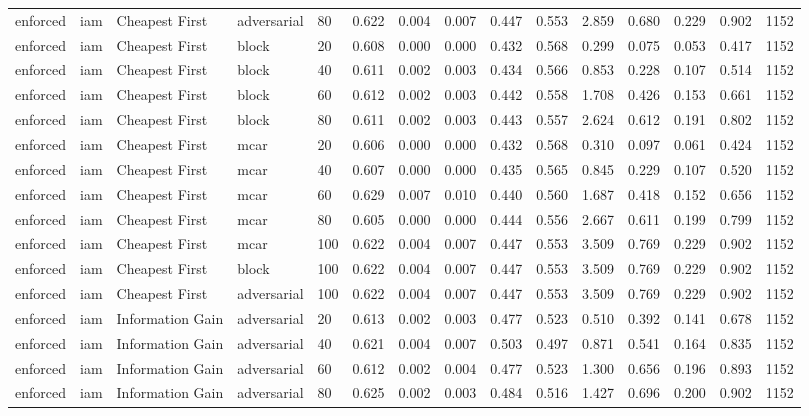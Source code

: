 \begin{table}[!ht]
{\begin{tabular}{lllllllllllllll}
enforced & iam & Cheapest First & adversarial & 80 & 0.622 & 0.004 & 0.007 & 0.447 & 0.553 & 2.859 & 0.680 & 0.229 & 0.902 & 1152 \\
enforced & iam & Cheapest First & block & 20 & 0.608 & 0.000 & 0.000 & 0.432 & 0.568 & 0.299 & 0.075 & 0.053 & 0.417 & 1152 \\
enforced & iam & Cheapest First & block & 40 & 0.611 & 0.002 & 0.003 & 0.434 & 0.566 & 0.853 & 0.228 & 0.107 & 0.514 & 1152 \\
enforced & iam & Cheapest First & block & 60 & 0.612 & 0.002 & 0.003 & 0.442 & 0.558 & 1.708 & 0.426 & 0.153 & 0.661 & 1152 \\
enforced & iam & Cheapest First & block & 80 & 0.611 & 0.002 & 0.003 & 0.443 & 0.557 & 2.624 & 0.612 & 0.191 & 0.802 & 1152 \\
enforced & iam & Cheapest First & mcar & 20 & 0.606 & 0.000 & 0.000 & 0.432 & 0.568 & 0.310 & 0.097 & 0.061 & 0.424 & 1152 \\
enforced & iam & Cheapest First & mcar & 40 & 0.607 & 0.000 & 0.000 & 0.435 & 0.565 & 0.845 & 0.229 & 0.107 & 0.520 & 1152 \\
enforced & iam & Cheapest First & mcar & 60 & 0.629 & 0.007 & 0.010 & 0.440 & 0.560 & 1.687 & 0.418 & 0.152 & 0.656 & 1152 \\
enforced & iam & Cheapest First & mcar & 80 & 0.605 & 0.000 & 0.000 & 0.444 & 0.556 & 2.667 & 0.611 & 0.199 & 0.799 & 1152 \\
enforced & iam & Cheapest First & mcar & 100 & 0.622 & 0.004 & 0.007 & 0.447 & 0.553 & 3.509 & 0.769 & 0.229 & 0.902 & 1152 \\
enforced & iam & Cheapest First & block & 100 & 0.622 & 0.004 & 0.007 & 0.447 & 0.553 & 3.509 & 0.769 & 0.229 & 0.902 & 1152 \\
enforced & iam & Cheapest First & adversarial & 100 & 0.622 & 0.004 & 0.007 & 0.447 & 0.553 & 3.509 & 0.769 & 0.229 & 0.902 & 1152 \\
enforced & iam & Information Gain & adversarial & 20 & 0.613 & 0.002 & 0.003 & 0.477 & 0.523 & 0.510 & 0.392 & 0.141 & 0.678 & 1152 \\
enforced & iam & Information Gain & adversarial & 40 & 0.621 & 0.004 & 0.007 & 0.503 & 0.497 & 0.871 & 0.541 & 0.164 & 0.835 & 1152 \\
enforced & iam & Information Gain & adversarial & 60 & 0.612 & 0.002 & 0.004 & 0.477 & 0.523 & 1.300 & 0.656 & 0.196 & 0.893 & 1152 \\
enforced & iam & Information Gain & adversarial & 80 & 0.625 & 0.002 & 0.003 & 0.484 & 0.516 & 1.427 & 0.696 & 0.200 & 0.902 & 1152 \\

\end{tabular}}
\end{table}
